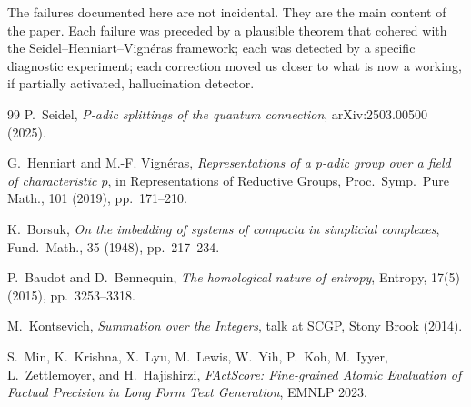 \documentclass[11pt]{amsart}
\theoremstyle{definition}
\begin{document}
The failures documented here are not incidental.
They are the main content of the paper.
Each failure was preceded by a plausible theorem that cohered with the
Seidel--Henniart--Vign\'eras framework; each was detected by a specific
diagnostic experiment; each correction moved us closer to what is now
a working, if partially activated, hallucination detector.

\begin{thebibliography}{99}
  P.~Seidel, \emph{P-adic splittings of the quantum connection},
  arXiv:2503.00500 (2025).

  G.~Henniart and M.-F. Vign\'eras,
  \emph{Representations of a p-adic group over a field of characteristic $p$},
  in Representations of Reductive Groups, Proc.\ Symp.\ Pure Math., 101 (2019),
  pp.\ 171--210.

  K.~Borsuk, \emph{On the imbedding of systems of compacta in simplicial complexes},
  Fund.\ Math., 35 (1948), pp.\ 217--234.

  P.~Baudot and D.~Bennequin,
  \emph{The homological nature of entropy},
  Entropy, 17(5) (2015), pp.\ 3253--3318.

  M.~Kontsevich, \emph{Summation over the Integers},
  talk at SCGP, Stony Brook (2014).

  S.~Min, K.~Krishna, X.~Lyu, M.~Lewis, W.~Yih, P.~Koh, M.~Iyyer,
  L.~Zettlemoyer, and H.~Hajishirzi,
  \emph{FActScore: Fine-grained Atomic Evaluation of Factual Precision in
  Long Form Text Generation}, EMNLP 2023.
\end{thebibliography}
\end{document}
